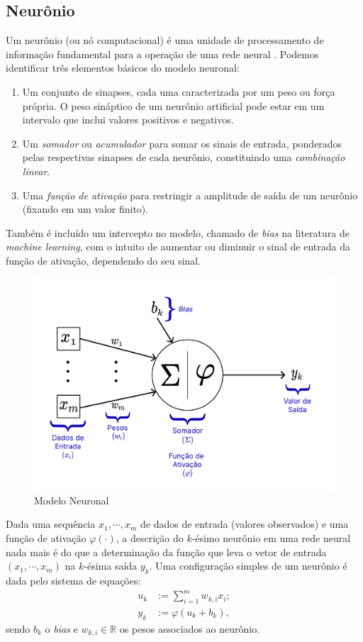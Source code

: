 \documentclass{automatextcc}
\newcommand{\R}{\mathds{R}}
\begin{document}
\subsection{Neurônio}
Um neurônio (ou nó computacional) é uma unidade de processamento de informação fundamental para a operação de uma rede neural \citep{haykin2009}. Podemos identificar três elementos básicos do modelo neuronal:
\begin{enumerate}
    \item Um conjunto de sinapses, cada uma caracterizada por um peso ou força própria. O peso sináptico de um neurônio artificial pode estar em um intervalo que inclui valores positivos e negativos.
    \item Um \textit{somador} ou \textit{acumulador} para somar os sinais de entrada, ponderados pelas respectivas sinapses de cada neurônio, constituindo uma \textit{combinação linear}.
    \item Uma \textit{função de ativação} para restringir a amplitude de saída de um neurônio (fixando em um valor finito).
\end{enumerate}
Também é incluído um intercepto no modelo, chamado de \textit{bias} na literatura de \textit{machine learning}, com o intuito de aumentar ou diminuir o sinal de entrada da função de ativação, dependendo do seu sinal.

\FloatBarrier
\begin{figure}[h!]
    \centering
    \includegraphics[width=.7\textwidth]{figuras/neuron_model.pdf}
	\caption{Modelo Neuronal \citep[adaptado de][]{hair2005,haykin2009}}
\end{figure}

Dada uma sequência $x_1,\cdots,x_m$ de dados de entrada (valores observados) e uma função de ativação $\varphi(\cdot)$, a descrição do $k$-ésimo neurônio em uma rede neural nada mais é do que a determinação da função que leva o vetor de entrada $(x_1,\cdots,x_m)$ na $k$-ésima saída $y_k$. Uma configuração simples de um neurônio é dada pelo sistema de equações:
\begin{align}\label{vk}
    u_k & := \sum_{i=1}^{m} w_{k,i}x_i; \nonumber\\   
    y_k & := \varphi(u_k + b_k),
\end{align}
sendo $b_k$ o \textit{bias} e $w_{k,i} \in \R$ os pesos associados ao neurônio.
\end{document}
